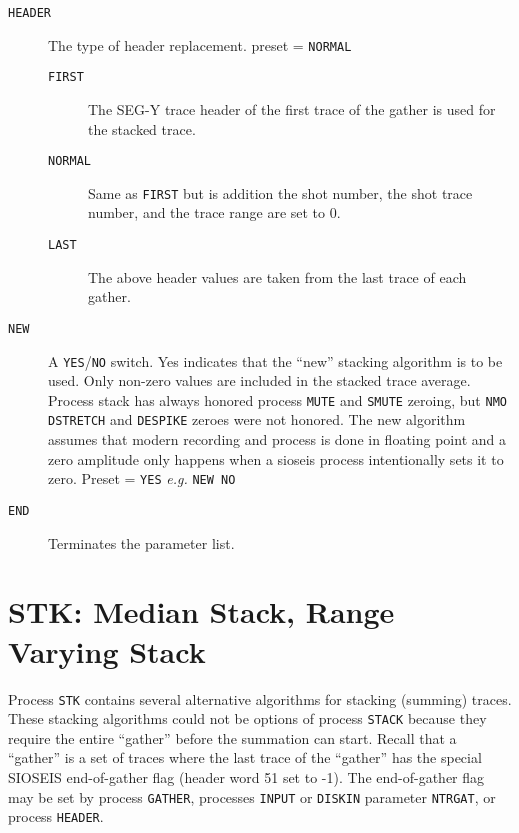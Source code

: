 \begin{description}
\item[\texttt{HEADER}] The type of header replacement. \Gls{preset} = \texttt{NORMAL}
\begin{description}
    \item[\texttt{FIRST}] The SEG-Y trace header of the first trace of the \gls{gather} is used for the stacked trace.
    \item[\texttt{NORMAL}] Same as \texttt{FIRST} but is addition the \gls{shot} number, the \gls{shot} trace number, and the trace range are set to 0.
    \item[\texttt{LAST}] The above header values are taken from the last trace of each \gls{gather}.
\end{description}

\item[\texttt{NEW}] A \texttt{YES}/\texttt{NO} switch.  Yes indicates that the
    ``new'' stacking algorithm is to be used.  Only non-zero values are
    included in the stacked trace average.  Process stack has always
    honored process \texttt{MUTE} and \texttt{SMUTE} zeroing, but
    \texttt{NMO} \texttt{DSTRETCH} and \texttt{DESPIKE} zeroes were not
    honored.  The new algorithm assumes that modern recording and process
    is done in floating point and a zero amplitude only happens when a
    sioseis process intentionally sets it to zero.
     Preset = \texttt{YES}        \textit{e.g.}   \texttt{NEW NO}

\item[\texttt{END}] Terminates the parameter list.
\end{description}

\section{STK: Median Stack, Range Varying Stack}
\label{cmd_stk}

Process \texttt{STK} contains several alternative algorithms for stacking
(summing) traces.  These stacking algorithms could not be options
of process \texttt{STACK} because they require the entire ``\gls{gather}'' before
the summation can start.  Recall that a ``\gls{gather}'' is a set of traces
where the last trace of the ``\gls{gather}'' has the special SIOSEIS
end-of-gather flag (header word 51 set to -1).  The end-of-gather
flag may be set by process \texttt{GATHER}, processes \texttt{INPUT} or \texttt{DISKIN}
parameter \texttt{NTRGAT}, or process \texttt{HEADER}.

